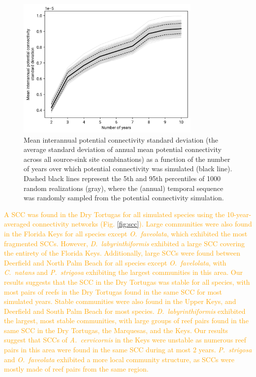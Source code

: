 \documentclass[preprint,12pt,authoryear]{elsarticle}
\newcommand{\added}[1]{\textcolor{orange}{#1}}
\begin{document}
	\begin{figure}
		\centering
		\includegraphics[width=0.8\textwidth]{figures/fig_cm_std.png}
		\caption{Mean interannual potential connectivity standard deviation (the average standard deviation of annual mean potential connectivity across all source-sink site combinations) as a function of the number of years over which potential connectivity was simulated (black line). Dashed black lines represent the 5th and 95th percentiles of 1000 random realizations (gray), where the (annual) temporal sequence was randomly sampled from the potential connectivity simulation.}\label{fig:saturation}
	\end{figure}
	
	\added{A SCC was found in the Dry Tortugas for all simulated species using the 10-year-averaged connectivity networks (Fig. \ref{fig:scc}). Large communities were also found in the Florida Keys for all species except \textit{O.~faveolata}, which exhibited the most fragmented SCCs. However, \textit{D.~labyrinthiformis} exhibited a large SCC covering the entirety of the Florida Keys. Additionally, large SCCs were found between Deerfield and North Palm Beach for all species except \textit{O.~favelolata}, with \textit{C.~natans} and \textit{P.~strigosa} exhibiting the largest communities in this area. Our results suggests that the SCC in the Dry Tortugas was stable for all species, with most pairs of reefs in the Dry Tortugas found in the same SCC for most simulated years. Stable communities were also found in the Upper Keys, and Deerfield and South Palm Beach for most species. \textit{D.~labyrinthiformis} exhibited the largest, most stable communities, with large groups of reef pairs found in the same SCC in the Dry Tortugas, the Marquesas, and the Keys. Our results suggest that SCCs of \textit{A.~cervicornis} in the Keys were unstable as numerous reef pairs in this area were found in the same SCC during at most 2 years. \textit{P.~strigosa} and  \textit{O.~faveolata} exhibited a more local community structure, as SCCs were mostly made of reef pairs from the same region.}
\end{document}
